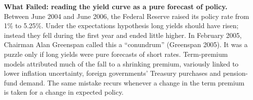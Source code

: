 \begin{callout}
\textbf{What Failed: reading the yield curve as a pure forecast of policy.} Between June 2004 and June 2006, the Federal Reserve raised its policy rate from 1\% to 5.25\%. Under the expectations hypothesis long yields should have risen; instead they fell during the first year and ended little higher. In February 2005, Chairman Alan Greenspan called this a ``conundrum'' (Greenspan 2005). It was a puzzle only if long yields were pure forecasts of short rates. Term-premium models attributed much of the fall to a shrinking premium, variously linked to lower inflation uncertainty, foreign governments' Treasury purchases and pension-fund demand. The same mistake recurs whenever a change in the term premium is taken for a change in expected policy.
\end{callout}
